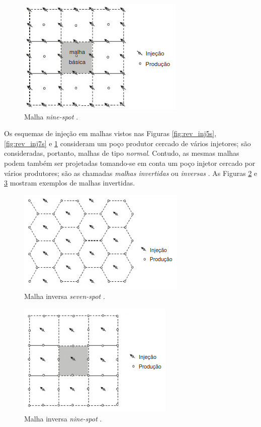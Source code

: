 \begin{figure}[!ht]
\centering
\includegraphics[width=.6\textwidth]{figs/revisao/revisao_inj9s.png}
\caption{Malha \textit{nine-spot} \cite[p. 568]{engres}.}
\label{fig:rev_inj9s}
\end{figure}

Os esquemas de inje\c{c}\~{a}o em malhas vistos nas Figuras \ref{fig:rev_inj5s}, \ref{fig:rev_inj7s} e \ref{fig:rev_inj9s} consideram um po\c{c}o produtor cercado de v\'{a}rios injetores; s\~{a}o consideradas, portanto, malhas de tipo \textit{normal}. Contudo, as mesmas malhas podem tamb\'{e}m ser projetadas tomando-se em conta um po\c{c}o injetor cercado por v\'{a}rios produtores; s\~{a}o as chamadas \textit{malhas invertidas} ou \textit{inversas} \cite[p. 569]{engres}. As Figuras \ref{fig:rev_inj7i} e \ref{fig:rev_inj9i} mostram exemplos de malhas invertidas.

\begin{figure}[!ht]
\centering
\includegraphics[width=.6\textwidth]{figs/revisao/revisao_inj7i.png}
\caption{Malha inversa \textit{seven-spot} \cite[p. 569]{engres}.}
\label{fig:rev_inj7i}
\end{figure}

\begin{figure}[!ht]
\centering
\includegraphics[width=.6\textwidth]{figs/revisao/revisao_inj9i.png}
\caption{Malha inversa \textit{nine-spot} \cite[p. 569]{engres}.}
\label{fig:rev_inj9i}
\end{figure}

